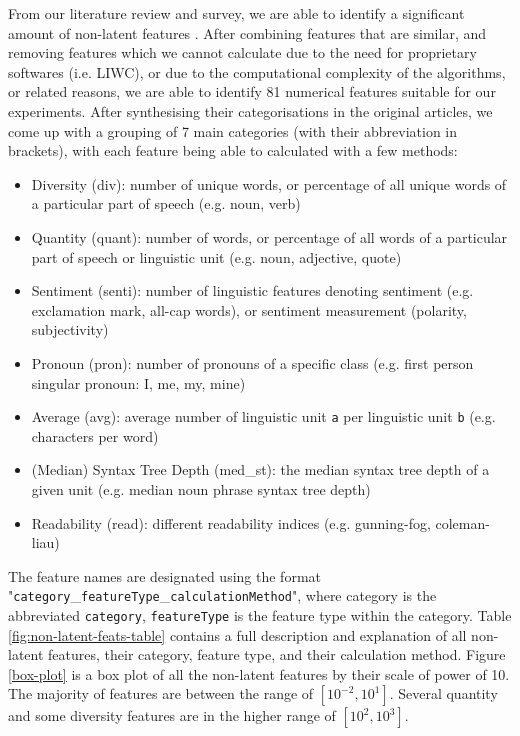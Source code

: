 \documentclass{article}
\begin{document}
From our literature review and survey, we are able to identify a significant amount of non-latent features \cite{zhou2020survey, garg2022linguistic, horne2017}. After combining features that are similar, and removing features which we cannot calculate due to the need for proprietary softwares (i.e. LIWC), or due to the computational complexity of the algorithms, or related reasons, we are able to identify 81 numerical features suitable for our experiments. After synthesising their categorisations in the original articles, we come up with a grouping of 7 main categories (with their abbreviation in brackets), with each feature being able to calculated with a few methods:
\begin{itemize}
  \item Diversity (div): number of unique words, or percentage of all unique words of a particular part of speech (e.g. noun, verb)
  \item Quantity (quant): number of words, or percentage of all words of a particular part of speech or linguistic unit (e.g. noun, adjective, quote)
  \item Sentiment (senti): number of linguistic features denoting sentiment (e.g. exclamation mark, all-cap words), or sentiment measurement (polarity, subjectivity)
  \item Pronoun (pron): number of pronouns of a specific class (e.g. first person singular pronoun: I, me, my, mine)
  \item Average (avg): average number of linguistic unit \texttt{a} per linguistic unit \texttt{b} (e.g. characters per word)
  \item (Median) Syntax Tree Depth (med\_st): the median syntax tree depth of a given unit (e.g. median noun phrase syntax tree depth)
  \item Readability (read): different readability indices (e.g. gunning-fog, coleman-liau)
\end{itemize}

The feature names are designated using the format "\texttt{category}\_\texttt{featureType}\_\texttt{calculationMethod}", where category is the abbreviated \texttt{category}, \texttt{featureType} is the feature type within the category. Table \ref{fig:non-latent-feats-table} contains a full description and explanation of all non-latent features, their category, feature type, and their calculation method. Figure \ref{box-plot} is a box plot of all the non-latent features by their scale of power of 10. The majority of features are between the range of $[10^{-2}, 10^{1}]$. Several quantity and some diversity features are in the higher range of $[10^2, 10^3]$. 
\end{document}
